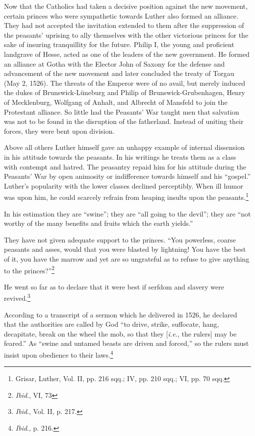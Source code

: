 Now that the Catholics had taken a decisive position against the
new movement, certain princes who were sympathetic towards
Luther also formed an alliance. They had not accepted the invitation
extended to them after the suppression of the peasants’ uprising to
ally themselves with the other victorious princes for the sake of insuring
tranquillity for the future. Philip I, the young and proficient
landgrave of Hesse, acted as one of the leaders of the new government.
He formed an alliance at Gotha with the Elector John of
Saxony for the defense and advancement of the new movement and
later concluded the treaty of Torgau (May 2, 1526). The threats of
the Emperor were of no avail, but merely induced the dukes of
Brunswick-Lüneburg and Philip of Brunswick-Grubenhagen, Henry
of Mecklenburg, Wolfgang of Anhalt, and Albrecht of Mansfeld to
join the Protestant alliance. So little had the Peasants’ War taught
men that salvation was not to be found in the disruption of the
fatherland. Instead of uniting their forces, they were bent upon
division.

Above all others Luther himself gave an unhappy example of internal dissension
in his attitude towards the peasants. In his writings
he treats them as a class with contempt and hatred. The peasantry
repaid him for his attitude during the Peasants’ War by open animosity
or indifference towards himself and his “gospel.” Luther’s
popularity with the lower classes declined perceptibly. When ill humor
was upon him, he could scarcely refrain from heaping insults upon the
peasants.\footnote
{Grisar, Luther, Vol. II, pp. 216 sqq.; IV, pp. 210 sqq.; VI, pp. 70 sqq.}

In his estimation they are “swine”; they are “all going to the devil”; they
are “not worthy of the many benefits and fruits which the earth yields.”

They have not given adequate support to the princes. “You powerless,
coarse peasants and asses, would that you were blasted by lightning! You
have the best of it, you have the marrow and yet are so ungrateful as to
refuse to give anything to the princes?”\footnote{\textit{Ibid}., VI, 73}

He went so far as to declare that it were best if serfdom and slavery were
revived.\footnote{\textit{Ibid}., Vol. II, p. 217.}

According to a transcript of a sermon which he delivered in 1526, he
declared that the authorities are called by God “to drive, strike, suffocate,
hang, decapitate, break on the wheel the mob, so that they [\textit{i.e.}, the rulers]
may be feared.” As “swine and untamed beasts are driven and forced,” so
the rulers must insist upon obedience to their laws.\footnote{\textit{Ibid}., p. 216.}

